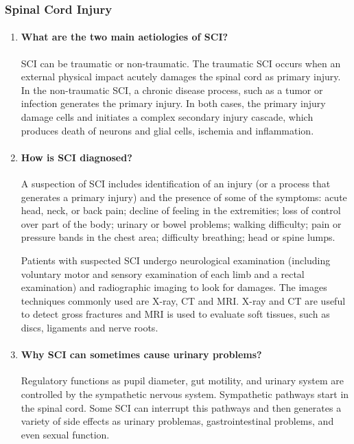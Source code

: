 \documentclass[12pt,article,oneside,a4paper]{memoir}
\begin{document}
\subsubsection{Spinal Cord Injury}
\begin{enumerate}
\item \paragraph{What are the two main aetiologies of SCI?}
SCI can be traumatic or non-traumatic.
The traumatic SCI occurs when an external physical impact acutely damages the
spinal cord as primary injury. In the non-traumatic SCI, a chronic disease
process, such as a tumor or infection generates the primary injury.
In both cases, the primary injury damage cells and initiates a complex secondary
injury cascade, which produces death of neurons and glial cells, ischemia and
inflammation.

\item \paragraph{How is SCI diagnosed?}
A suspection of SCI includes identification of an injury (or a process that
generates a primary injury) and the presence of some of the symptoms: acute
head, neck, or back pain; decline of feeling in the extremities; loss of
control over part of the body; urinary or bowel problems; walking difficulty;
pain or pressure bands in the chest area; difficulty breathing; head or spine
lumps.

Patients with suspected SCI undergo neurological examination (including
voluntary motor and sensory examination of each limb and a rectal examination)
and radiographic imaging to look for damages. The images techniques commonly
used are X-ray, CT and MRI. X-ray and CT are useful to detect gross fractures
and MRI is used to evaluate soft tissues, such as discs, ligaments and nerve
roots.

\item \paragraph{Why SCI can sometimes cause urinary problems?}
Regulatory functions as pupil diameter, gut motility, and urinary system are
controlled by the sympathetic nervous system. Sympathetic pathways start in the
spinal cord. Some SCI can interrupt this pathways and then generates a variety
of side effects as urinary problemas, gastrointestinal problems, and even
sexual function.


\end{enumerate}
\end{document}
